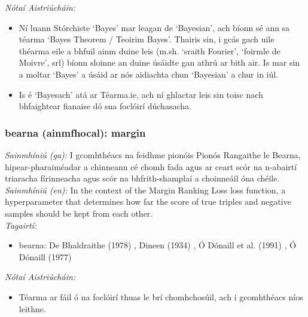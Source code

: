  \noindent \textit{Nótaí Aistriúcháin:}
\begin{itemize}
	\item Ní luann Stórchiste `Bayes' mar leagan de `Bayesian', ach bíonn sé ann sa téarma `Bayes Theorem / Teoirim Bayes'. Thairis sin, i gcás gach uile théarma eile a bhfuil ainm duine leis (m.sh. `sraith Fourier', `foirmle de Moivre', srl) bíonn sloinne an duine úsáidte gan athrú ar bith air. Is mar sin a moltar `Bayes' a úsáid ar nós aidiachta chun `Bayesian' a chur in iúl.
	\item Is é `Bayesach' atá ar Téarma.ie, ach ní ghlactar leis sin toisc nach bhfaightear fianaise dó sna foclóirí dúchasacha.
\end{itemize}


\subsubsection*{bearna (ainmfhocal): margin}
 \noindent \textit{Sainmhíniú (ga):} I gcomhthéacs na feidhme pionóis Pionós Rangaithe le Bearna, hipear-pharaiméadar a chinneann cé chomh fada agus ar ceart scór na n-abairtí triaracha fírinneacha agus scór na bhfrith-shamplaí a choinneáil óna chéile.
\\
 \noindent \textit{Sainmhíniú (en):} In the context of the Margin Ranking Loss loss function, a hyperparameter that determines how far the score of true triples and negative samples should be kept from each other.
\\
 \noindent \textit{Tagairtí:}
\begin{itemize}
	\item bearna: De Bhaldraithe (1978) \cite{de-bhaldraithe}, Dineen (1934) \cite{dineen}, Ó Dónaill et al. (1991) \cite{focloir-beag}, Ó Dónaill (1977) \cite{odonaill}
\end{itemize}

 \noindent \textit{Nótaí Aistriúcháin:}
\begin{itemize}
	\item Téarma ar fáil ó na foclóirí thuas le brí chomhchosúil, ach i gcomhthéacs níos leithne.
\end{itemize}


